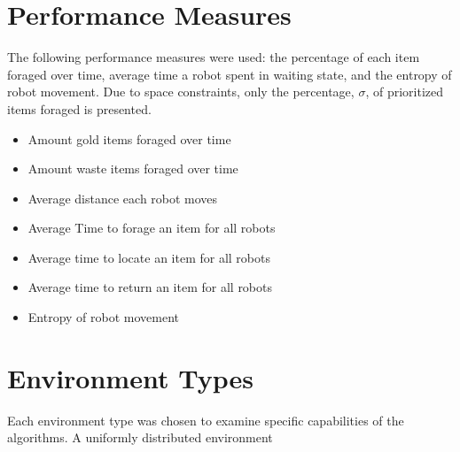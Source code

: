 \section{Performance Measures}
\label{thri:third:performancemeasures}

The following performance measures were used: the percentage of each item foraged over time, average time a robot spent in waiting state, and the entropy of robot movement. Due to space constraints, only the percentage, $\sigma$, of prioritized items foraged is presented. 

	\begin{itemize}
		\item	Amount gold items foraged over time
		\item	Amount waste items foraged over time
		\item	Average distance each robot moves
		\item	Average Time to forage an item for all robots
		\item	Average time to locate an item for all robots
		\item	Average time to return an item for all robots
		\item	Entropy of robot movement
	\end{itemize}
	

\section{Environment Types}
\label{thri:third:environmenttypes}
Each environment type was chosen to examine specific capabilities of the algorithms. A uniformly distributed environment 

